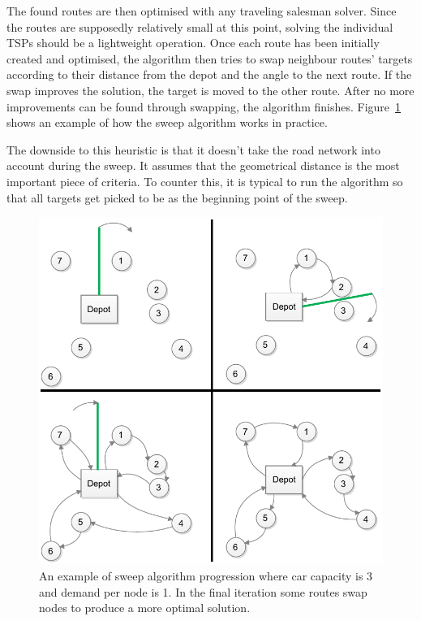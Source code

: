 The found routes are then optimised with any traveling salesman solver. Since the routes are supposedly relatively small at this point, solving the individual TSPs should be a lightweight operation. Once each route has been initially created and optimised, the algorithm then tries to swap neighbour routes' targets according to their distance from the depot and the angle to the next route. If the swap improves the solution, the target is moved to the other route. After no more improvements can be found through swapping, the algorithm finishes. \cite{gillett1974heuristic} Figure~\ref{fig:sweep1} shows an example of how the sweep algorithm works in practice. 

The downside to this heuristic is that it doesn't take the road network into account during the sweep. It assumes that the geometrical distance is the most important piece of criteria. To counter this, it is typical to run the algorithm so that all targets get picked to be as the beginning point of the sweep. \cite{reimann2004d} 


\begin{figure}[h]
  \begin{center}
    \includegraphics{images/Sweep1.pdf}
    \caption{An example of sweep algorithm progression where car capacity is 3 and demand per node is 1. In the final iteration some routes swap nodes to produce a more optimal solution.}
    \label{fig:sweep1}
  \end{center}
\end{figure}

